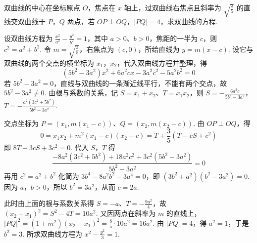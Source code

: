 \begin{problem}
双曲线的中心在坐标原点 \(O\)，焦点在 \(x\) 轴上，过双曲线右焦点且斜率为 \(\sqrt{\frac{3}{5}}\) 的直线交双曲线于 \(P\)，\(Q\) 两点，若 \(OP\perp OQ\)，\(|PQ|=4\)，求双曲线的方程.

\begin{solution}
设双曲线方程为 \(\frac{x^2}{a^2}-\frac{y^2}{b^2}=1\)，其中 \(a>0\)、\(b>0\)，焦距的一半为 \(c\)，则 \(c^2=a^2+b^2\). 令 \(m=\sqrt{\frac35}\)，右焦点为 \((c,0)\)，所给直线为 \(y=m(x-c)\). 设它与双曲线的两个交点的横坐标为 \(x_1\)，\(x_2\)，代入双曲线方程并整理，得
\[
\left(5b^2-3a^2\right)x^2+6a^2cx-3a^2c^2-5a^2b^2=0
\]
若 \(5b^2-3a^2=0\)，直线与双曲线的一条渐近线平行，不能有两个交点，故 \(5b^2-3a^2\ne0\). 由根与系数的关系，记 \(S=x_1+x_2\)、\(T=x_1x_2\)，则
\(S=-\frac{6a^2c}{5b^2-3a^2}\)，\(T=-\frac{a^2(3c^2+5b^2)}{5b^2-3a^2}\).

交点坐标为 \(P=(x_1,m(x_1-c))\)、\(Q=(x_2,m(x_2-c))\). 由 \(OP\perp OQ\)，得
\[
0=x_1x_2+m^2(x_1-c)(x_2-c)=T+\frac35(T-cS+c^2)
\]
即 \(8T-3cS+3c^2=0\). 代入 \(S\)，\(T\) 得
\[
\frac{-8a^2(3c^2+5b^2)+18a^2c^2+3c^2(5b^2-3a^2)}{5b^2-3a^2}=0
\]
再用 \(c^2=a^2+b^2\) 化简为 \(3b^4-8a^2b^2-3a^4=0\)，即 \((3b^2+a^2)(b^2-3a^2)=0\). 因为 \(a\)，\(b>0\)，所以 \(b^2=3a^2\)，从而 \(c=2a\).

此时由上面的根与系数关系得 \(S=-a\)、\(T=-\frac{9a^2}{4}\)，故 \((x_2-x_1)^2=S^2-4T=10a^2\). 又因两点在斜率为 \(m\) 的直线上，\(|PQ|^2=(1+m^2)(x_2-x_1)^2=\frac85\cdot10a^2=16a^2\). 由 \(|PQ|=4\)，得 \(a^2=1\)，于是 \(b^2=3\). 所求双曲线方程为 \(\boxed{x^2-\frac{y^2}{3}=1}\).
\end{solution}
\end{problem}
